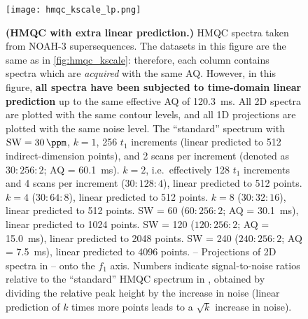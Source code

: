 \begin{figure}
    \centering
    \texttt{[image: hmqc\_kscale\_lp.png]}
    {\label{fig:hmqc_kscale_lp_std}}
    {\label{fig:hmqc_kscale_lp_k2}}
    {\label{fig:hmqc_kscale_lp_k4}}
    {\label{fig:hmqc_kscale_lp_k8}}
    {\label{fig:hmqc_kscale_lp_sw2}}
    {\label{fig:hmqc_kscale_lp_sw4}}
    {\label{fig:hmqc_kscale_lp_sw8}}
    {\label{fig:hmqc_kscale_lp_std_proj}}
    {\label{fig:hmqc_kscale_lp_k2_proj}}
    {\label{fig:hmqc_kscale_lp_k4_proj}}
    {\label{fig:hmqc_kscale_lp_k8_proj}}
    {\label{fig:hmqc_kscale_lp_sw2_proj}}
    {\label{fig:hmqc_kscale_lp_sw4_proj}}
    {\label{fig:hmqc_kscale_lp_sw8_proj}}
    \caption{
        \textbf{(HMQC with extra linear prediction.)}
        \nitrogen{} HMQC spectra taken from NOAH-3  supersequences.
        The datasets in this figure are the same as in \cref{fig:hmqc_kscale}: therefore, each column contains spectra which are \textit{acquired} with the same AQ.
        However, in this figure, \textbf{all spectra have been subjected to time-domain linear prediction} up to the same effective AQ of \SI{120.3}{\ms}.
        All 2D spectra are plotted with the same contour levels, and all 1D projections are plotted with the same noise level.
        \textbf{} The ``standard'' spectrum with $\mathrm{SW} = \SI{30}{\ppm}$, $k = 1$, 256 $t_1$ increments (linear predicted to 512 indirect-dimension points), and 2 scans per increment (denoted as $30:256:2$; AQ = \SI{60.1}{\ms}).
        \textbf{} $k = 2$, i.e.\ effectively 128 $t_1$ increments and 4 scans per increment ($30:128:4$), linear predicted to 512 points.
        \textbf{} $k = 4$ ($30:64:8$), linear predicted to 512 points.
        \textbf{} $k = 8$ ($30:32:16$), linear predicted to 512 points.
        \textbf{} SW = \SI{60}{\ppm} ($60:256:2$; AQ = \SI{30.1}{\ms}), linear predicted to 1024 points.
        \textbf{} SW = \SI{120}{\ppm} ($120:256:2$; AQ = \SI{15.0}{\ms}), linear predicted to 2048 points.
        \textbf{} SW = \SI{240}{\ppm} ($240:256:2$; AQ = \SI{7.5}{\ms}), linear predicted to 4096 points.
        \textbf{}--\textbf{} Projections of 2D spectra in -- onto the $f_1$ axis.
        Numbers indicate signal-to-noise ratios relative to the ``standard'' HMQC spectrum in , obtained by dividing the relative peak height by the increase in noise (linear prediction of $k$ times more points leads to a $\sqrt{k}$ increase in noise).
        \grami{}
    }
    \label{fig:hmqc_kscale_lp}
\end{figure}

